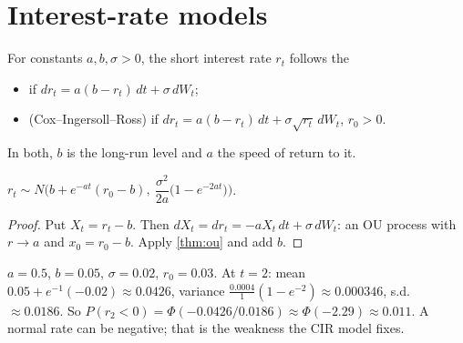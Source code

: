 \begin{pic}
\end{pic}

\section{Interest-rate models}

\begin{definition}
For constants $a,b,\sigma>0$, the short interest rate $r_t$ follows the
\begin{itemize}
  \item {} if $dr_t=a(b-r_t)\,dt+\sigma\,dW_t$;
  \item {} (Cox--Ingersoll--Ross) if $dr_t=a(b-r_t)\,dt+\sigma\sqrt{r_t}\,dW_t$, $r_0>0$.
\end{itemize}
In both, $b$ is the long-run level and $a$ the speed of return to it.
\end{definition}

\begin{result}
\label{res:vasicek}
$r_t\sim N\Big(b+e^{-at}(r_0-b),\ \dfrac{\sigma^2}{2a}\big(1-e^{-2at}\big)\Big)$.
\end{result}
\begin{proof}
Put $X_t=r_t-b$. Then $dX_t=dr_t=-aX_t\,dt+\sigma\,dW_t$: an OU process with $r\to a$ and $x_0=r_0-b$. Apply \cref{thm:ou} and add $b$.
\end{proof}

\begin{example}
\label{ex:vasicek}
$a=0.5$, $b=0.05$, $\sigma=0.02$, $r_0=0.03$. At $t=2$: mean $0.05+e^{-1}(-0.02)\approx0.0426$, variance $\frac{0.0004}{1}(1-e^{-2})\approx0.000346$, s.d.\ $\approx0.0186$. So $P(r_2<0)=\Phi(-0.0426/0.0186)\approx\Phi(-2.29)\approx0.011$. A normal rate can be negative; that is the weakness the CIR model fixes.
\end{example}

